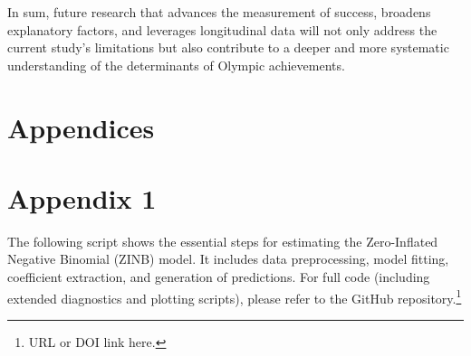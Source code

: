 \documentclass[11pt,twoside]{article}
\numberwithin{Theorem}{section}
\numberwithin{Definition}{section}
\numberwithin{Lemma}{section}
\numberwithin{Algorithm}{section}
\numberwithin{equation}{section}
\begin{document}
In sum, future research that advances the measurement of success, broadens explanatory factors, and leverages longitudinal data will not only address the current study’s limitations but also contribute to a deeper and more systematic understanding of the determinants of Olympic achievements.  





\label{subsec:model_structure}

\appendix
\section*{Appendices}

\section{Appendix 1}
\label{app:one}

The following script shows the essential steps for estimating the Zero-Inflated Negative Binomial (ZINB) model. 
It includes data preprocessing, model fitting, coefficient extraction, and generation of predictions. 
For full code (including extended diagnostics and plotting scripts), please refer to the GitHub repository.\footnote{URL or DOI link here.}
\end{document}
